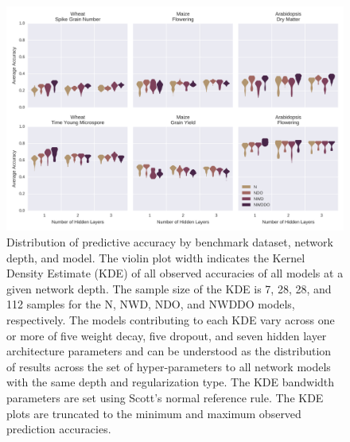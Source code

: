 
\begin{figure}[htbp]
\renewcommand{\familydefault}{\sfdefault}\normalfont
\centering 
\includegraphics[keepaspectratio,height=\textheight,width=\linewidth]{g3_article/figures/depth_comparison.png}
    \caption{Distribution of predictive accuracy by benchmark dataset, network depth, 
             and model. The violin plot width indicates the Kernel Density Estimate 
             (KDE) of all observed accuracies of all models at a given network depth. 
             The sample size of the KDE is 7, 28, 28, and 112 samples for the 
             N, NWD, NDO, and NWDDO models, respectively. The models contributing 
             to each KDE vary across one or more of five weight decay, five dropout, 
             and seven hidden layer architecture parameters and can be 
             understood as the distribution of results across the set of 
             hyper-parameters to all network models with the same depth and regularization
             type. The KDE bandwidth parameters are set using Scott's normal reference rule. 
             The KDE plots are truncated to the minimum and maximum observed prediction accuracies.} 
\label{fig:depth-comparison}
\end{figure}

